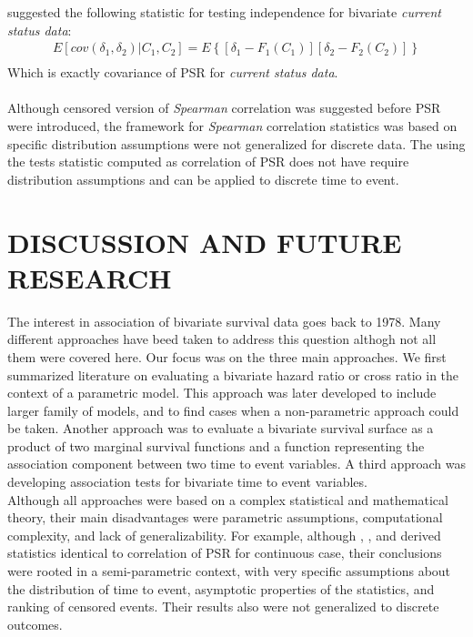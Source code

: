 \documentclass[]{article}
\begin{document}
\cite{ding2004testing} suggested the following statistic for testing independence for bivariate \emph{current status data}:
	$$
	\begin{aligned}
		 E[cov(\delta_1, \delta_2)|C_1,C_2] = E\left\{ [\delta_1 - F_1(C_1)][\delta_2 - F_2(C_2)]  \right\}\\
	\end{aligned}
	$$
Which is exactly covariance of PSR for \emph{current status data}.\\
~\\
Although censored version of \emph{Spearman} correlation was suggested before PSR were introduced, the framework for \emph{Spearman} correlation statistics was based on specific distribution assumptions were not generalized for discrete data. The using the tests statistic computed as correlation of PSR does not have require distribution assumptions and can be applied to discrete time to event.

\section{DISCUSSION AND FUTURE RESEARCH}

The interest in association of bivariate survival data goes back to 1978. Many different approaches have beed taken to address this question althogh not all them were covered here. Our focus was on the three main approaches. We first summarized literature on evaluating a bivariate hazard ratio or cross ratio in the context of a parametric model. This approach was later developed to include larger family of models, and to find cases when a non-parametric approach could be taken. Another approach was to evaluate a bivariate survival surface as a product of two marginal survival functions and a function representing the association component between two time to event variables. A third approach was developing association tests for bivariate time to event variables.\\

Although all approaches were based on a complex statistical and mathematical theory, their main disadvantages were parametric assumptions, computational complexity, and lack of generalizability. For example, although \cite{cuzick1982rank}, \cite{dabrowska1988kaplan}, and \cite{ding2004testing} derived statistics identical to correlation of PSR for continuous case, their conclusions were rooted in a semi-parametric context, with very specific assumptions about the distribution of time to event, asymptotic properties of the statistics, and ranking of censored events. Their results also were not generalized to discrete outcomes.\\
\end{document}
